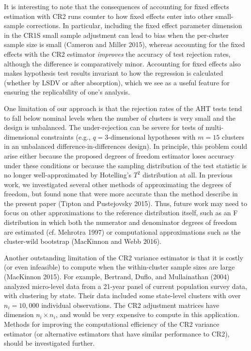 \documentclass[12pt]{article}
\begin{document}
It is interesting to note that the consequences of accounting for fixed
effects estimation with CR2 runs counter to how fixed effects enter into
other small-sample corrections. In particular, including the fixed
effect parameter dimension in the CR1S small sample adjustment can lead
to bias when the per-cluster sample size is small (Cameron and Miller
2015), whereas accounting for the fixed effects with the CR2 estimator
\emph{improves} the accuracy of test rejection rates, although the
difference is comparatively minor. Accounting for fixed effects also
makes hypothesis test results invariant to how the regression is
calculated (whether by LSDV or after absorption), which we see as a
useful feature for ensuring the replicability of one's analysis.

One limitation of our approach is that the rejection rates of the AHT
tests tend to fall below nominal levels when the number of clusters is
very small and the design is unbalanced. The under-rejection can be
severe for tests of multi-dimensional constraints (e.g.,
\(q = 3\)-dimensional hypotheses with \(m = 15\) clusters in an
unbalanced difference-in-differences design). In principle, this problem
could arise either because the proposed degrees of freedom estimator
loses accuracy under these conditions or because the sampling
distribution of the test statistic is no longer well-approximated by
Hotelling's \(T^2\) distribution at all. In previous work, we
investigated several other methods of approximating the degrees of
freedom, but found none that were more accurate than the method describe
in the present paper (Tipton and Pustejovsky 2015). Thus, future work
may need to focus on other approximations to the reference distribution
itself, such as an F distribution in which both the numerator and
denominator degrees of freedom are estimated (cf. Mehrotra 1997) or
computational approximations such as the cluster-wild bootstrap
(MacKinnon and Webb 2016).

Another outstanding limitation of the CR2 variance estimator is that it
is costly (or even infeasible) to compute when the within-cluster sample
sizes are large (MacKinnon 2015). For example, Bertrand, Duflo, and
Mullainathan (2004) analyzed micro-level data from a 21-year panel of
current population survey data, with clustering by state. Their data
included some state-level clusters with over \(n_i = 10,000\) individual
observations. The CR2 adjustment matrices have dimension
\(n_i \times n_i\), and would be very expensive to compute in this
application. Methods for improving the computational efficiency of the
CR2 variance estimator (or alternative estimators that have similar
performance to CR2), should be investigated further.
\end{document}
